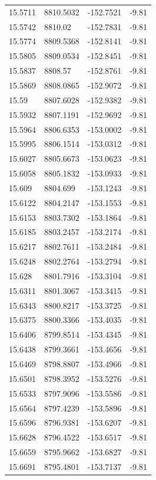 \begin{table}[H]
\begin{tabular}{llll}
15.5711 & 8810.5032 & -152.7521 & -9.81 \\
15.5742 & 8810.02 & -152.7831 & -9.81 \\
15.5774 & 8809.5368 & -152.8141 & -9.81 \\
15.5805 & 8809.0534 & -152.8451 & -9.81 \\
15.5837 & 8808.57 & -152.8761 & -9.81 \\
15.5869 & 8808.0865 & -152.9072 & -9.81 \\
15.59 & 8807.6028 & -152.9382 & -9.81 \\
15.5932 & 8807.1191 & -152.9692 & -9.81 \\
15.5964 & 8806.6353 & -153.0002 & -9.81 \\
15.5995 & 8806.1514 & -153.0312 & -9.81 \\
15.6027 & 8805.6673 & -153.0623 & -9.81 \\
15.6058 & 8805.1832 & -153.0933 & -9.81 \\
15.609 & 8804.699 & -153.1243 & -9.81 \\
15.6122 & 8804.2147 & -153.1553 & -9.81 \\
15.6153 & 8803.7302 & -153.1864 & -9.81 \\
15.6185 & 8803.2457 & -153.2174 & -9.81 \\
15.6217 & 8802.7611 & -153.2484 & -9.81 \\
15.6248 & 8802.2764 & -153.2794 & -9.81 \\
15.628 & 8801.7916 & -153.3104 & -9.81 \\
15.6311 & 8801.3067 & -153.3415 & -9.81 \\
15.6343 & 8800.8217 & -153.3725 & -9.81 \\
15.6375 & 8800.3366 & -153.4035 & -9.81 \\
15.6406 & 8799.8514 & -153.4345 & -9.81 \\
15.6438 & 8799.3661 & -153.4656 & -9.81 \\
15.6469 & 8798.8807 & -153.4966 & -9.81 \\
15.6501 & 8798.3952 & -153.5276 & -9.81 \\
15.6533 & 8797.9096 & -153.5586 & -9.81 \\
15.6564 & 8797.4239 & -153.5896 & -9.81 \\
15.6596 & 8796.9381 & -153.6207 & -9.81 \\
15.6628 & 8796.4522 & -153.6517 & -9.81 \\
15.6659 & 8795.9662 & -153.6827 & -9.81 \\
15.6691 & 8795.4801 & -153.7137 & -9.81 \\

\end{tabular}
\end{table}
